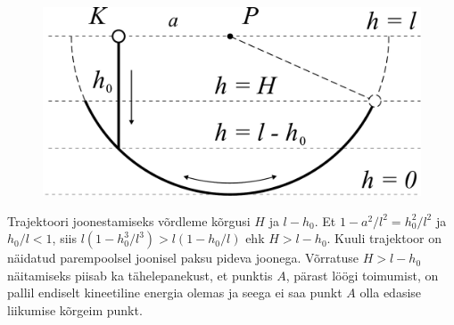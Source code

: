 \begin{figure}
\vspace{-1cm}
  \begin{center}
    \includegraphics[width=1\linewidth]{2024-v2g-06-sol2.pdf}
  \end{center}
  \vspace{-1.0cm}
\end{figure}

Trajektoori joonestamiseks võrdleme kõrgusi $H$ ja $l-h_0$. Et $1-a^2/l^2=h_0^2/l^2$ ja $h_0/l<1$, siis
$l(1-h_0^3/l^3)>l(1-h_0/l)$
ehk $H>l-h_0$.
Kuuli trajektoor on näidatud parempoolsel joonisel paksu pideva joonega. Võrratuse $H>l-h_0$ näitamiseks piisab ka tähelepanekust, et punktis $A$, pärast löögi toimumist, on pallil endiselt kineetiline energia olemas ja seega ei saa punkt $A$ olla edasise liikumise kõrgeim punkt.
\probend